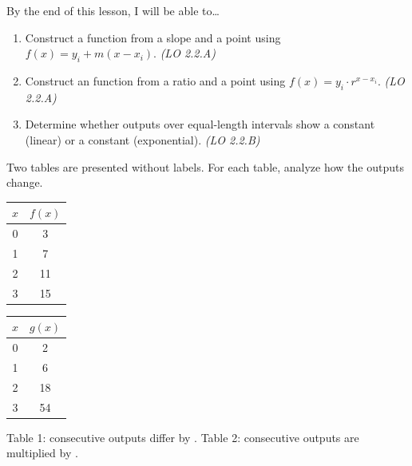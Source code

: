 \documentclass[10pt]{article}
\begin{document}
\namedateperiod

\vspace{0.06in}

\begin{objectivebox}
By the end of this lesson, I will be able to\ldots
\begin{enumerate}[itemsep=2pt]
  \item Construct a \blank{3cm} function from a slope and a point using
        $f(x) = y_i + m(x - x_i)$. \hfill\textit{(LO 2.2.A)}
  \item Construct an \blank{3cm} function from a ratio and a point using
        $f(x) = y_i \cdot r^{x - x_i}$. \hfill\textit{(LO 2.2.A)}
  \item Determine whether outputs over equal-length intervals show a constant \blank{2.5cm}
        (linear) or a constant \blank{2cm} (exponential). \hfill\textit{(LO 2.2.B)}
\end{enumerate}
\end{objectivebox}

\vspace{0.04in}

\begin{vocabbox}
\end{vocabbox}

\vspace{0.04in}

\begin{hookbox}
Two tables are presented without labels. For each table, analyze how the outputs change.

\medskip
\renewcommand{\arraystretch}{1.3}
\begin{tabular}{c|c}
$x$ & $f(x)$ \\ \hline
0 & 3 \\ 1 & 7 \\ 2 & 11 \\ 3 & 15
\end{tabular}
\qquad\qquad
\begin{tabular}{c|c}
$x$ & $g(x)$ \\ \hline
0 & 2 \\ 1 & 6 \\ 2 & 18 \\ 3 & 54
\end{tabular}

\medskip
Table 1: consecutive outputs differ by \blank{2cm}. \quad
Table 2: consecutive outputs are multiplied by \blank{2cm}.
\end{hookbox}
\end{document}
